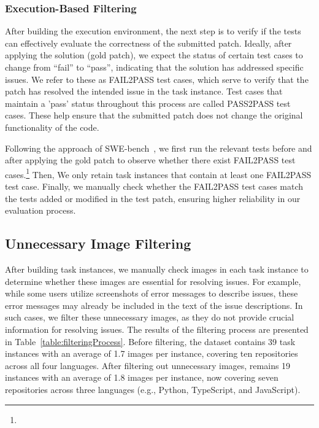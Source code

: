 \subsubsection{Execution-Based Filtering}
After building the execution environment, the next step is to verify if the tests can effectively evaluate the correctness of the submitted patch. Ideally, after applying the solution (gold patch), we expect the status of certain test cases to change from ``fail'' to ``pass'', indicating that the solution has addressed specific issues. We refer to these as FAIL2PASS test cases, which serve to verify that the patch has resolved the intended issue in the task instance. Test cases that maintain a 'pass' status throughout this process are called PASS2PASS test cases. These help ensure that the submitted patch does not change the original functionality of the code.

Following the approach of SWE-bench~\cite{jimenez2023swe}, we first run the relevant tests before and after applying the gold patch to observe whether there exist FAIL2PASS test cases.\footnote{} Then, We only retain task instances that contain at least one FAIL2PASS test case. Finally, we manually check whether the FAIL2PASS test cases match the tests  added or modified in the test patch, ensuring higher reliability in our evaluation process.


\subsection{Unnecessary Image Filtering}  
After building task instances, we manually check images in each task instance to determine whether these images are essential for resolving issues. For example, while some users utilize screenshots of error messages to describe issues, these error messages may already be included in the text of the issue descriptions. In such cases, we filter these unnecessary images, as they do not provide crucial information for resolving issues.
The results of the filtering process are presented in Table~\ref{table:filteringProcess}. Before filtering, the dataset contains 39 task instances with an average of 1.7 images per instance, covering ten repositories across all four languages. After filtering out unnecessary images, \Swebenchx remains 19 instances with an average of 1.8 images per instance, now covering seven repositories across three languages (e.g., Python, TypeScript, and JavaScript).

